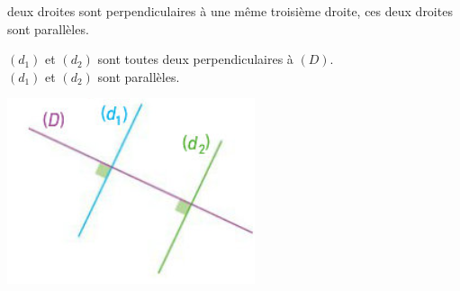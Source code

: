 \documentclass[xcolor={dvipsnames}]{beamer}
\begin{document}
\begin{frame}
	\begin{myprop}
		 deux droites sont perpendiculaires à une même troisième droite,  ces deux droites sont parallèles.
	\end{myprop}
	
	
	\begin{myex}
			 $(d_1)$ et $(d_2)$ sont toutes deux perpendiculaires à $(D)$.\\
			 $(d_1)$ et $(d_2)$ sont parallèles.
			
			\begin{center}
				\includegraphics[scale=0.6]{../img/para2}
			\end{center}
		
	\end{myex}
\end{frame}
\end{document}
